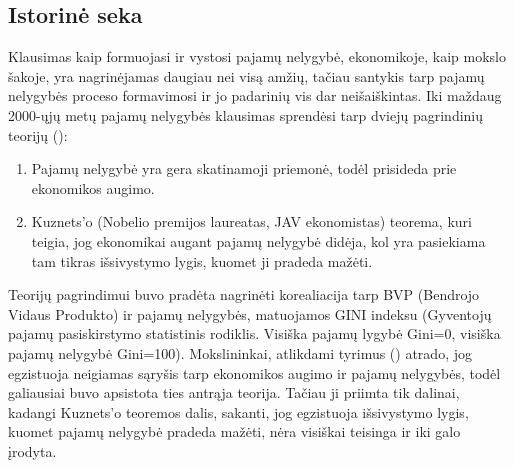 \documentclass[12pt,a4paper,titlepage]{article}
\begin{document}
\subsection{Istorinė seka}
Klausimas kaip formuojasi ir vystosi pajamų nelygybė, ekonomikoje, kaip mokslo šakoje, yra nagrinėjamas daugiau nei visą amžių, tačiau santykis tarp pajamų nelygybės proceso formavimosi ir jo padarinių vis dar neišaiškintas. Iki maždaug 2000-ųjų metų pajamų nelygybės klausimas sprendėsi tarp dviejų pagrindinių teorijų (\cite{aghion1998growth}):
\begin{enumerate}
\item Pajamų nelygybė yra gera skatinamoji priemonė, todėl prisideda prie ekonomikos augimo. 
\item Kuznets'o (Nobelio premijos laureatas, JAV ekonomistas) teorema, kuri teigia, jog ekonomikai augant pajamų nelygybė didėja, kol yra pasiekiama tam tikras išsivystymo lygis, kuomet ji pradeda mažėti.  
\end{enumerate}
Teorijų pagrindimui buvo pradėta nagrinėti korealiacija tarp BVP (Bendrojo Vidaus Produkto) ir pajamų nelygybės, matuojamos GINI indeksu (Gyventojų pajamų pasiskirstymo statistinis rodiklis. Visiška pajamų lygybė Gini=0, visiška pajamų nelygybė Gini=100). Mokslininkai, atlikdami tyrimus (\cite{alesina1994distributive}) atrado, jog egzistuoja neigiamas sąryšis tarp ekonomikos augimo ir pajamų nelygybės, todėl galiausiai buvo apsistota ties antrąja teorija. Tačiau ji priimta tik dalinai, kadangi Kuznets'o teoremos dalis, sakanti, jog egzistuoja išsivystymo lygis, kuomet pajamų nelygybė pradeda mažėti, nėra visiškai teisinga ir iki galo įrodyta.  
\end{document}
